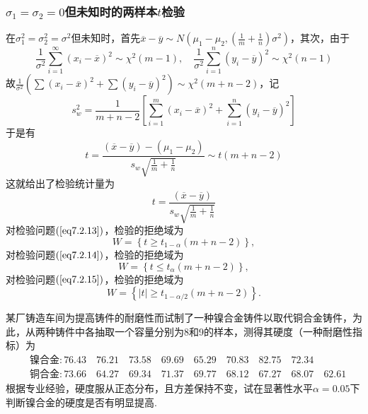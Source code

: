 \subsubsection{$\sigma_{1}=\sigma_{ 2 }=0$但未知时的两样本$t$检验}

在$\sigma _ { 1 } ^ { 2 } = \sigma _ { 2 } ^ { 2 } = \sigma ^ { 2 }$但未知时，首先$\overline { x } - \overline { y } \sim N \left( \mu _ { 1 } - \mu _ { 2 } , \left( \frac { 1 } { m } + \frac { 1 } { n } \right) \sigma ^ { 2 } \right)$，其次，由于
\[\frac { 1 } { \sigma ^ { 2 } } \sum _ { i = 1 } ^ { \infty } \left( x _ { i } - \overline { x } \right) ^ { 2 } \sim \chi ^ { 2 } ( m - 1 ) , \quad \frac { 1 } { \sigma ^ { 2 } } \sum _ { i = 1 } ^ { n } \left( y _ { i } - \overline { y } \right) ^ { 2 } \sim \chi ^ { 2 } ( n - 1 )\]
故$\frac { 1 } { \sigma ^ { 2 } } \left( \sum \left( x _ { i } - \overline { x } \right) ^ { 2 } + \sum \left( y _ { i } - \overline { y } \right) ^ { 2 } \right) \sim \chi ^ { 2 } ( m + n - 2 )$，记
\[s _ { w } ^ { 2 } = \frac { 1 } { m + n - 2 } \left[ \sum _ { i = 1 } ^ { m } \left( x _ { i } - \overline { x } \right) ^ { 2 } + \sum _ { i = 1 } ^ { n } \left( y _ { i } - \overline { y } \right) ^ { 2 } \right]\]
于是有
\[t = \frac { ( \overline { x } - \overline { y } ) - \left( \mu _ { 1 } - \mu _ { 2 } \right) } { s _ { w } \sqrt { \frac { 1 } { m } + \frac { 1 } { n } } } \sim t ( m + n - 2 )\]
这就给出了检验统计量为
\[t = \frac { ( \overline { x } - \overline { y } ) } { s _ { w } \sqrt { \frac { 1 } { m } + \frac { 1 } { n } } }\]
对检验问题$(\ref{eq7.2.13})$，检验的拒绝域为
\begin{equation}\label{eq7.2.19}
  W=\left\{t\geq t_{1-\alpha}\left(m+n-2\right)\right\},
\end{equation}
对检验问题$(\ref{eq7.2.14})$，检验的拒绝域为
\begin{equation}\label{eq7.2.20}
  W=\left\{t\leq t_{\alpha}\left(m+n-2\right)\right\},
\end{equation}
对检验问题$(\ref{eq7.2.15})$，检验的拒绝域为
\begin{equation}\label{eq7.2.21}
  W = \left\{ | t | \geq t _ { 1 - \alpha/ 2 } ( m + n - 2 ) \right\}.
\end{equation}
\begin{example}\label{exam7.2.3}
	某厂铸造车间为提高铸件的耐磨性而试制了一种镍合金铸件以取代铜合金铸件，为此，从两种铸件中各抽取一个容量分别为8和9的样本，测得其硬度（一种耐磨性指标）为
	\begin{align*}
	&\text{镍合金}:76.43 \quad 76.21 \quad 73.58 \quad 69.69 \quad 65.29 \quad 70.83 \quad 82.75 \quad 72.34\\
	&\text{铜合金}:73.66 \quad 64.27 \quad 69.34 \quad 71.37 \quad 69.77 \quad 68.12 \quad 67.27 \quad 68.07 \quad 62.61
	\end{align*}
	根据专业经验，硬度服从正态分布，且方差保持不变，试在显著性水平$\alpha=0.05$下判断镍合金的硬度是否有明显提高.
\end{example}
